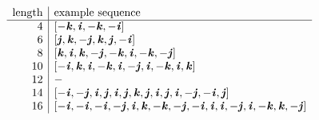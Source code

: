 \documentclass[12pt]{article}
\theoremstyle{definition}
\begin{document}
\[
\begin{array}{r|l}
\text{length} & \text{example sequence} \\
\hline
4 &  [-\kk, \ii, -\kk, -\ii]\\
6 & [\jj, \kk, -\jj, \kk, \jj, -\ii]\\
8 & [\kk, \ii, \kk, -\jj, -\kk, \ii, -\kk, -\jj]\\
10 & [-\ii, \kk, \ii, -\kk, \ii, -\jj, \ii, -\kk, \ii, \kk] \\
12 & -\\
14 & [-\ii, -\jj, \ii, \jj, \ii, \jj, \kk, \jj, \ii, \jj, \ii, -\jj, -\ii, \jj]\\
16 & [-\ii, -\ii, -\ii, -\jj, \ii, \kk, -\kk, -\jj, -\ii, \ii, \ii, -\jj, \ii, -\kk, \kk, -\jj]\\
\end{array}\]
\end{document}

